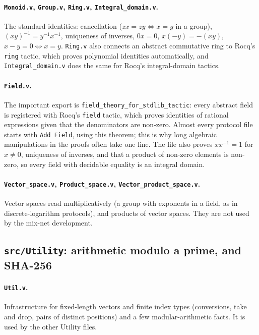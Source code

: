 \documentclass[11pt,a4paper]{article}
\theoremstyle{definition}
\theoremstyle{plain}
\begin{document}
\paragraph{\texttt{Monoid.v}, \texttt{Group.v}, \texttt{Ring.v}, \texttt{Integral\_domain.v}.} The
standard identities: cancellation ($zx=zy\iff x=y$ in a group), $(xy)^{-1}=y^{-1}x^{-1}$,
uniqueness of inverses, $0x=0$, $x(-y)=-(xy)$, $x-y=0\iff x=y$. \texttt{Ring.v} also connects an
abstract commutative ring to Rocq's \texttt{ring} tactic, which proves polynomial identities
automatically, and \texttt{Integral\_domain.v} does the same for Rocq's integral-domain tactics.

\paragraph{\texttt{Field.v}.} The important export is \texttt{field\_theory\_for\_stdlib\_tactic}:
every abstract field is registered with Rocq's \texttt{field} tactic, which proves identities of
rational expressions given that the denominators are non-zero. Almost every protocol file starts
with \texttt{Add Field}, using this theorem; this is why long algebraic manipulations in the proofs
often take one line. The file also proves $xx^{-1}=1$ for $x\ne0$, uniqueness of inverses, and that
a product of non-zero elements is non-zero, so every field with decidable equality is an integral
domain.

\paragraph{\texttt{Vector\_space.v}, \texttt{Product\_space.v}, \texttt{Vector\_product\_space.v}.}
Vector spaces read multiplicatively (a group with exponents in a field, as in discrete-logarithm
protocols), and products of vector spaces. They are not used by the mix-net development.

\subsection{\texttt{src/Utility}: arithmetic modulo a prime, and SHA-256}

\paragraph{\texttt{Util.v}.} Infrastructure for fixed-length vectors and finite index types
(conversions, take and drop, pairs of distinct positions) and a few modular-arithmetic facts. It is
used by the other Utility files.
\end{document}
